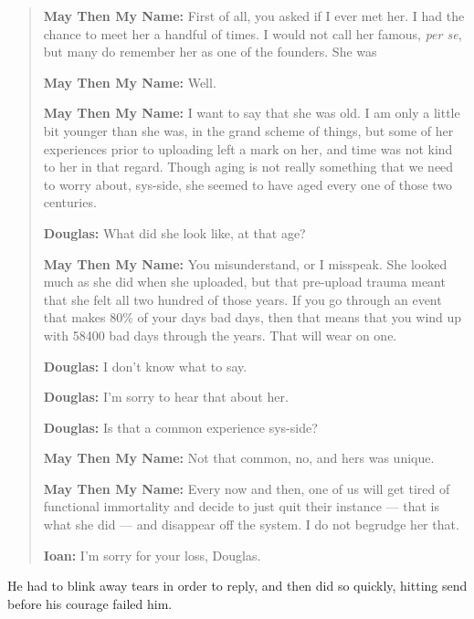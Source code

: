 \begin{quote}
\textbf{May Then My Name:} First of all, you asked if I ever met her. I had the chance to meet her a handful of times. I would not call her famous, \emph{per se}, but many do remember her as one of the founders. She was

\textbf{May Then My Name:} Well.

\textbf{May Then My Name:} I want to say that she was old. I am only a little bit younger than she was, in the grand scheme of things, but some of her experiences prior to uploading left a mark on her, and time was not kind to her in that regard. Though aging is not really something that we need to worry about, sys-side, she seemed to have aged every one of those two centuries.

\textbf{Douglas:} What did she look like, at that age?

\textbf{May Then My Name:} You misunderstand, or I misspeak. She looked much as she did when she uploaded, but that pre-upload trauma meant that she felt all two hundred of those years. If you go through an event that makes 80\% of your days bad days, then that means that you wind up with 58400 bad days through the years. That will wear on one.

\textbf{Douglas:} I don't know what to say.

\textbf{Douglas:} I'm sorry to hear that about her.

\textbf{Douglas:} Is that a common experience sys-side?

\textbf{May Then My Name:} Not that common, no, and hers was unique.

\textbf{May Then My Name:} Every now and then, one of us will get tired of functional immortality and decide to just quit their instance — that is what she did — and disappear off the system. I do not begrudge her that.

\textbf{Ioan:} I'm sorry for your loss, Douglas.
\end{quote}

He had to blink away tears in order to reply, and then did so quickly, hitting send before his courage failed him.

